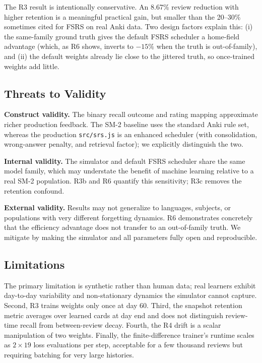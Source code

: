 \documentclass[conference]{IEEEtran}
\begin{document}
The R3 result is intentionally conservative. An 8.67\% review reduction with higher retention is a meaningful practical gain, but smaller than the 20--30\% sometimes cited for FSRS on real Anki data. Two design factors explain this: (i) the same-family ground truth gives the default FSRS scheduler a home-field advantage (which, as R6 shows, inverts to $-15\%$ when the truth is out-of-family), and (ii) the default weights already lie close to the jittered truth, so once-trained weights add little.

\subsection{Threats to Validity}

\textbf{Construct validity.} The binary recall outcome and rating mapping approximate richer production feedback. The SM-2 baseline uses the standard Anki rule set, whereas the production \texttt{src/srs.js} is an enhanced scheduler (with consolidation, wrong-answer penalty, and retrieval factor); we explicitly distinguish the two.

\textbf{Internal validity.} The simulator and default FSRS scheduler share the same model family, which may understate the benefit of machine learning relative to a real SM-2 population. R3b and R6 quantify this sensitivity; R3c removes the retention confound.

\textbf{External validity.} Results may not generalize to languages, subjects, or populations with very different forgetting dynamics. R6 demonstrates concretely that the efficiency advantage does not transfer to an out-of-family truth. We mitigate by making the simulator and all parameters fully open and reproducible.

\subsection{Limitations}

The primary limitation is synthetic rather than human data; real learners exhibit day-to-day variability and non-stationary dynamics the simulator cannot capture. Second, R3 trains weights only once at day 60. Third, the snapshot retention metric averages over learned cards at day end and does not distinguish review-time recall from between-review decay. Fourth, the R4 drift is a scalar manipulation of two weights. Finally, the finite-difference trainer's runtime scales as $2 \times 19$ loss evaluations per step, acceptable for a few thousand reviews but requiring batching for very large histories.
\end{document}
